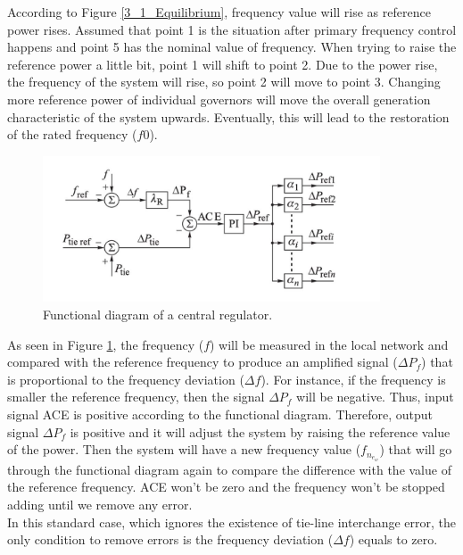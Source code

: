 \documentclass{report}
\begin{document}
According to Figure \textcolor{red}{\ref{3_1_Equilibrium}}, frequency value will rise as reference power rises. Assumed that point 1 is the situation after primary frequency control happens and point 5 has the nominal value of frequency. When trying to raise the reference power a little bit, point 1 will shift to point 2. Due to the power rise, the frequency of the system will rise, so point 2 will move to point 3. Changing more reference power of individual governors will move the overall generation characteristic of the system upwards. Eventually, this will lead to the restoration of the rated frequency ($f0$).\\

\begin{figure}[htb]
\centering
\includegraphics[width = 0.891\textwidth]{figure/3_1_Functional.png}
\caption{Functional diagram of a central regulator.}
\label{3_1_Functional}
\end{figure}

As seen in Figure \textcolor{red}{\ref{3_1_Functional}}, the frequency ($f$) will be measured in the local network and compared with the reference frequency to produce an amplified signal ($\Delta P_f$) that is proportional to the frequency deviation ($\Delta f$). For instance, if the frequency is smaller the reference frequency, then the signal $\Delta P_f$ will be negative. Thus, input signal ACE is positive according to the functional diagram. Therefore, output signal $\Delta P_f$ is positive and it will adjust the system by raising the reference value of the power. Then the system will have a new frequency value ($f_n_e_w$) that will go through the functional diagram again to compare the difference with the value of the reference frequency. ACE won’t be zero and the frequency won’t be stopped adding until we remove any error.\\

In this standard case, which ignores the existence of tie-line interchange error, the only condition to remove errors is the frequency deviation ($\Delta f$) equals to zero.\\
\end{document}
